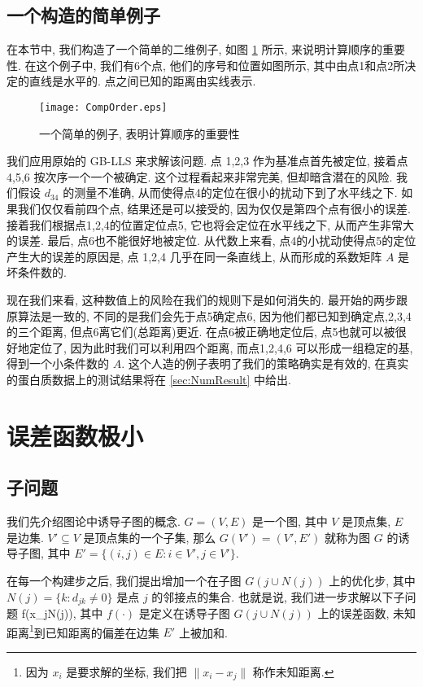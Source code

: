 \documentclass{CASthesis_zzk}
\begin{document}
\subsection{一个构造的简单例子}
在本节中, 我们构造了一个简单的二维例子, 如图 \ref{fig:CompOrder} 所示,
来说明计算顺序的重要性.
在这个例子中, 我们有6个点, 他们的序号和位置如图所示,
其中由点1和点2所决定的直线是水平的.
点之间已知的距离由实线表示.

\begin{figure}[htp]
  \centering
  \texttt{[image: CompOrder.eps]}\\
  \caption{一个简单的例子, 表明计算顺序的重要性}
  \label{fig:CompOrder}
\end{figure}

我们应用原始的 GB-LLS 来求解该问题. 
点 1,2,3 作为基准点首先被定位, 接着点 4,5,6 按次序一个一个被确定.
这个过程看起来非常完美, 但却暗含潜在的风险.
我们假设 $d_{34}$ 的测量不准确, 从而使得点4的定位在很小的扰动下到了水平线之下.
如果我们仅仅看前四个点, 结果还是可以接受的, 因为仅仅是第四个点有很小的误差. 
接着我们根据点1,2,4的位置定位点5,
它也将会定位在水平线之下, 从而产生非常大的误差.
最后, 点6也不能很好地被定位.
从代数上来看, 点4的小扰动使得点5的定位产生大的误差的原因是,
点 1,2,4 几乎在同一条直线上, 从而形成的系数矩阵 $A$ 是坏条件数的.

现在我们来看, 这种数值上的风险在我们的规则下是如何消失的.
最开始的两步跟原算法是一致的, 不同的是我们会先于点5确定点6,
因为他们都已知到确定点,2,3,4 的三个距离, 但点6离它们(总距离)更近.
在点6被正确地定位后, 点5也就可以被很好地定位了,
因为此时我们可以利用四个距离, 而点1,2,4,6 可以形成一组稳定的基,
得到一个小条件数的 $A$.
这个人造的例子表明了我们的策略确实是有效的, 
在真实的蛋白质数据上的测试结果将在 \ref{sec:NumResult} 中给出.


\section{误差函数极小}
\label{sec:opt}
\subsection{子问题}
我们先介绍图论中诱导子图的概念. 
$G=(V,E)$ 是一个图, 其中 $V$ 是顶点集, $E$ 是边集.
$V'\subseteq V$ 是顶点集的一个子集, 
那么 $G(V')=(V',E')$ 就称为图 $G$ 的诱导子图, 
其中 $E'=\{(i,j)\in E: i\in V', j\in V'\}$.

在每一个构建步之后, 我们提出增加一个在子图 $G(j\cup N(j))$ 上的优化步, 
其中 $N(j)=\{k: d_{jk}\neq 0\}$ 是点 $j$ 的邻接点的集合. 
也就是说, 我们进一步求解以下子问题
\be \min  f(x_{j\cup N(j)}), \label{prob:sub}\ee
其中 $f(\cdot)$ 是定义在诱导子图 $G(j\cup N(j))$ 上的误差函数, 
未知距离\footnote{因为 $x_i$ 是要求解的坐标, 我们把 $\|x_i-x_j\|$ 称作未知距离.}到已知距离的偏差在边集 $E'$ 上被加和. 
\end{document}
